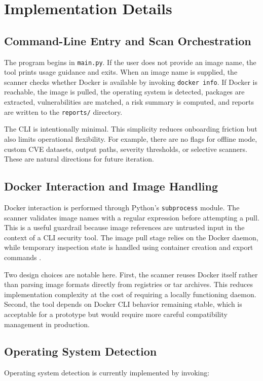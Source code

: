 \documentclass[12pt,draftclsnofoot,onecolumn]{IEEEtran}
\begin{document}
\section{Implementation Details}
\subsection{Command-Line Entry and Scan Orchestration}
The program begins in \texttt{main.py}. If the user does not provide an image name, the tool prints usage guidance and exits. When an image name is supplied, the scanner checks whether Docker is available by invoking \texttt{docker info}. If Docker is reachable, the image is pulled, the operating system is detected, packages are extracted, vulnerabilities are matched, a risk summary is computed, and reports are written to the \texttt{reports/} directory.

The CLI is intentionally minimal. This simplicity reduces onboarding friction but also limits operational flexibility. For example, there are no flags for offline mode, custom CVE datasets, output paths, severity thresholds, or selective scanners. These are natural directions for future iteration.

\subsection{Docker Interaction and Image Handling}
Docker interaction is performed through Python's \texttt{subprocess} module. The scanner validates image names with a regular expression before attempting a pull. This is a useful guardrail because image references are untrusted input in the context of a CLI security tool. The image pull stage relies on the Docker daemon, while temporary inspection state is handled using container creation and export commands \cite{dockercreate,dockerexport}.

Two design choices are notable here. First, the scanner reuses Docker itself rather than parsing image formats directly from registries or tar archives. This reduces implementation complexity at the cost of requiring a locally functioning daemon. Second, the tool depends on Docker CLI behavior remaining stable, which is acceptable for a prototype but would require more careful compatibility management in production.

\subsection{Operating System Detection}
Operating system detection is currently implemented by invoking:
\end{document}

